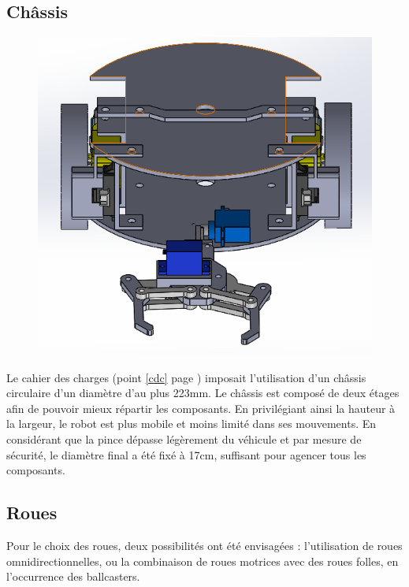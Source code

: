\documentclass[a4paper,11pt]{article}
\begin{document}
\subsection{Châssis}
\begin{figure}[H]
        \centering
        \includegraphics[scale = 0.8]{robot_nu.PNG}
    \hfill
\end{figure}

Le cahier des charges (point \ref{cdc} page \pageref{cdc}) imposait l'utilisation d'un châssis circulaire d'un diamètre d'au plus 223mm. Le châssis est composé de deux étages afin de pouvoir mieux répartir les composants. En privilégiant ainsi la hauteur à la largeur, le robot est plus mobile et moins limité dans ses mouvements. En considérant que la pince dépasse légèrement du véhicule et par mesure de sécurité, le diamètre final a été fixé à 17cm, suffisant pour agencer tous les composants.

\subsection{Roues}

Pour le choix des roues, deux possibilités ont été envisagées : l'utilisation de roues omnidirectionnelles, ou la combinaison de roues motrices avec des roues folles, en l'occurrence des ballcasters.
\end{document}
